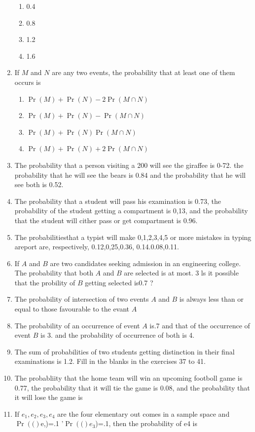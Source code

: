 \documentclass[12pt]{article}
\providecommand{\pr}[1]{\ensuremath{\Pr\left(#1\right)}}
\begin{document}
\begin{enumerate}[resume]
\begin{enumerate}
\item 0.4
\item 0.8
\item 1.2
\item 1.6
\end{enumerate}
\item If $M$ and $N$ are any two events, the probability that at least one of them occurs is
\begin{enumerate}
	\item $\pr{M}+\pr{N}-2 \pr {M\cap N}$
	\item $\pr{M}+\pr{N}-\pr{M\cap N}$
	\item $\pr{M}+\pr{N}\pr{M\cap N}$
	\item $\pr{M}+\pr{N}+2\pr{M\cap N}$
\end{enumerate}
\item The probability that a person visiting a 200 will see the giraffee is 0-72. the probability that he will see the bears is 0.84 and the probability that he will see both is 0.52.
\item The probability that a student will pass his examination is 0.73, the probability of the student getting a compartment is 0,13, and the probability that the student will cither pass or get compartment is 0.96.
\item The probabilitiesthat a typist will make 0,1,2,3,4,5 or more mistakes in typing areport are, respectively, 0.12,0,25,0.36, 0.14.0.08,0.11.
\item If $A$ and $B$ are two candidates seeking admission in an engineering college. The probability that both $A$ and $B$ are selected is at most. 3 ls it possible that the probility of $B$ getting selected is0.7 ?
\item The probability of intersection of two events $A$ and $B$ is always less than or equal to those favourable to the evant $A$
\item The probability of an occurrence of event $A$ is.7 and that of the occurrence of event $B$ is 3. and the probability of occurrence of both is 4.
\item The sum of probabilities of two students getting distinction in their final examinations is 1.2. 
Fill in the blanks in the exercises 37 to 41. 
\item The probabliity that the home team will win an upcoming footboll game is 0.77, the probability that it will tie the game is 0.08, and the probability that it will lose the game is     
\item If $e_1 ,e_2, e_3, e_4$ are the four elementary out comes in a sample space and \pr (e,)=.1 '\pr ($e_3$)=.1, then the probability of e4 is

\end{enumerate}
\end{document}
